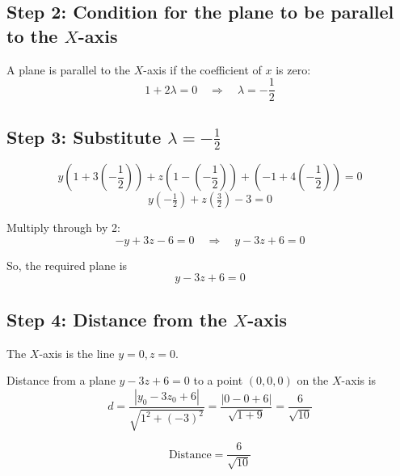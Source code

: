 \documentclass{beamer}
\begin{document}
\begin{frame}
\subsection*{Step 2: Condition for the plane to be parallel to the $X$-axis}

A plane is parallel to the $X$-axis if the coefficient of $x$ is zero:
\begin{equation}
1 + 2\lambda = 0 \quad \Rightarrow \quad \lambda = -\frac{1}{2}
\end{equation}

\subsection*{Step 3: Substitute $\lambda = -\frac{1}{2}$}

\begin{equation}
y\left(1 + 3\left(-\frac{1}{2}\right)\right) + z\left(1 - \left(-\frac{1}{2}\right)\right) + \left(-1 + 4\left(-\frac{1}{2}\right)\right) = 0
\end{equation}
\begin{equation}
y(-\tfrac{1}{2}) + z(\tfrac{3}{2}) - 3 = 0
\end{equation}

Multiply through by 2:
\begin{equation}
- y + 3z - 6 = 0 \quad \Rightarrow \quad y - 3z + 6 = 0
\end{equation}
\end{frame}

\begin{frame}
So, the required plane is
\begin{equation}
\boxed{y - 3z + 6 = 0}
\end{equation}
\subsection*{Step 4: Distance from the $X$-axis}

The $X$-axis is the line $y = 0, z = 0$.  

Distance from a plane $y - 3z + 6 = 0$ to a point $(0,0,0)$ on the $X$-axis is
\begin{equation}
d = \frac{|y_0 - 3 z_0 + 6|}{\sqrt{1^2 + (-3)^2}} = \frac{|0 - 0 + 6|}{\sqrt{1 + 9}} = \frac{6}{\sqrt{10}}
\end{equation}

\begin{equation}
\boxed{\text{Distance} = \frac{6}{\sqrt{10}}}
\end{equation}
\end{frame}
\end{document}
